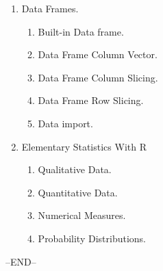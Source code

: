 \documentclass[10pt,a4paper]{article}
\begin{document}
\begin{enumerate}
\begin{enumerate}
			\end{enumerate}
		\item Data Frames.
			\begin{enumerate}
				\item Built-in Data frame.
				\item Data Frame Column Vector.
				\item Data Frame Column Slicing.
				\item Data Frame Row Slicing.
				\item Data import.
			\end{enumerate}
		\item Elementary Statistics With R
			\begin{enumerate}
				\item Qualitative Data.
				\item Quantitative Data.
				\item Numerical Measures.
				\item Probability Distributions.
			\end{enumerate}
	\end{enumerate}

\centering --END--
\end{document}

